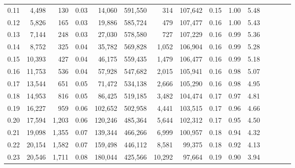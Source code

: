 \begin{tabular}{rrrcrrrrrrrrrrr}
0.11 &   4,498 &    130 &                                       0.03 &   14,060 &  591,550 &      314 &  107,642 &  0.15 &  1.00 &                         5.48 \\
0.12 &   5,826 &    165 &                                       0.03 &   19,886 &  585,724 &      479 &  107,477 &  0.16 &  1.00 &                         5.43 \\
0.13 &   7,144 &    248 &                                       0.03 &   27,030 &  578,580 &      727 &  107,229 &  0.16 &  0.99 &                         5.36 \\
0.14 &   8,752 &    325 &                                       0.04 &   35,782 &  569,828 &    1,052 &  106,904 &  0.16 &  0.99 &                         5.28 \\
0.15 &  10,393 &    427 &                                       0.04 &   46,175 &  559,435 &    1,479 &  106,477 &  0.16 &  0.99 &                         5.18 \\
0.16 &  11,753 &    536 &                                       0.04 &   57,928 &  547,682 &    2,015 &  105,941 &  0.16 &  0.98 &                         5.07 \\
0.17 &  13,544 &    651 &                                       0.05 &   71,472 &  534,138 &    2,666 &  105,290 &  0.16 &  0.98 &                         4.95 \\
0.18 &  14,953 &    816 &                                       0.05 &   86,425 &  519,185 &    3,482 &  104,474 &  0.17 &  0.97 &                         4.81 \\
0.19 &  16,227 &    959 &                                       0.06 &  102,652 &  502,958 &    4,441 &  103,515 &  0.17 &  0.96 &                         4.66 \\
0.20 &  17,594 &  1,203 &                                       0.06 &  120,246 &  485,364 &    5,644 &  102,312 &  0.17 &  0.95 &                         4.50 \\
0.21 &  19,098 &  1,355 &                                       0.07 &  139,344 &  466,266 &    6,999 &  100,957 &  0.18 &  0.94 &                         4.32 \\
0.22 &  20,154 &  1,582 &                                       0.07 &  159,498 &  446,112 &    8,581 &   99,375 &  0.18 &  0.92 &                         4.13 \\
0.23 &  20,546 &  1,711 &                                       0.08 &  180,044 &  425,566 &   10,292 &   97,664 &  0.19 &  0.90 &                         3.94 \\

\end{tabular}
